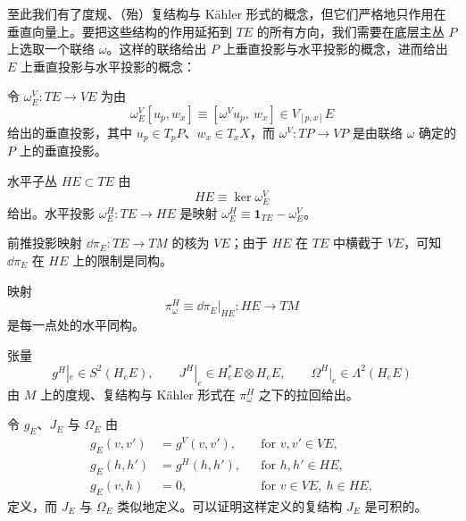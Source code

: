 至此我们有了度规、（殆）复结构与 Kähler 形式的概念，但它们严格地只作用在垂直向量上。要把这些结构的作用延拓到 $TE$ 的所有方向，我们需要在底层主丛 $P$ 上选取一个联络 $\omega$。这样的联络给出 $P$ 上垂直投影与水平投影的概念，进而给出 $E$ 上垂直投影与水平投影的概念：

\begin{definition}
令 $\omega^V_E: TE\to VE$ 为由
\[ \omega^V_E[u_p,w_x]\equiv[\omega^V u_p,\ w_x]\in V_{[p,x]}E \]
给出的垂直投影，其中 $u_p\in T_pP$、$w_x\in T_xX$，而 $\omega^V: TP\to VP$ 是由联络 $\omega$ 确定的 $P$ 上的垂直投影。
\end{definition}

\begin{definition}
水平子丛 $HE\subset TE$ 由
\[ HE\equiv\ker\omega^V_E \]
给出。水平投影 $\omega^H_E: TE\to HE$ 是映射 $\omega^H_E\equiv\mathbf{1}_{TE}-\omega^V_E$。
\end{definition}

前推投影映射 $\dd\pi_E: TE\to TM$ 的核为 $VE$；由于 $HE$ 在 $TE$ 中横截于 $VE$，可知 $\dd\pi_E$ 在 $HE$ 上的限制是同构。


\begin{definition}
映射
\[ \pi^H_\omega \equiv \dd\pi_E|_{HE}: HE\to TM \]
是每一点处的水平同构。
\end{definition}

\begin{definition}
张量
\[
    g^H|_e\in S^2(H_eE),\qquad J^H|_e\in H_e^*E\otimes H_eE,\qquad \Omega^H|_e\in\Lambda^2(H_eE)
\]
由 $M$ 上的度规、复结构与 Kähler 形式在 $\pi^H_\omega$ 之下的拉回给出。
\end{definition}

\begin{definition}
令 $g_E$、$J_E$ 与 $\Omega_E$ 由
\begin{align*}
    g_E(v,v') &= g^V(v,v'), & & \text{for } v,v'\in VE,\\
    g_E(h,h') &= g^H(h,h'), & & \text{for } h,h'\in HE,\\
    g_E(v,h) &= 0, & & \text{for } v\in VE,\ h\in HE,
\end{align*}
定义，而 $J_E$ 与 $\Omega_E$ 类似地定义。可以证明这样定义的复结构 $J_E$ 是可积的。
\end{definition}

